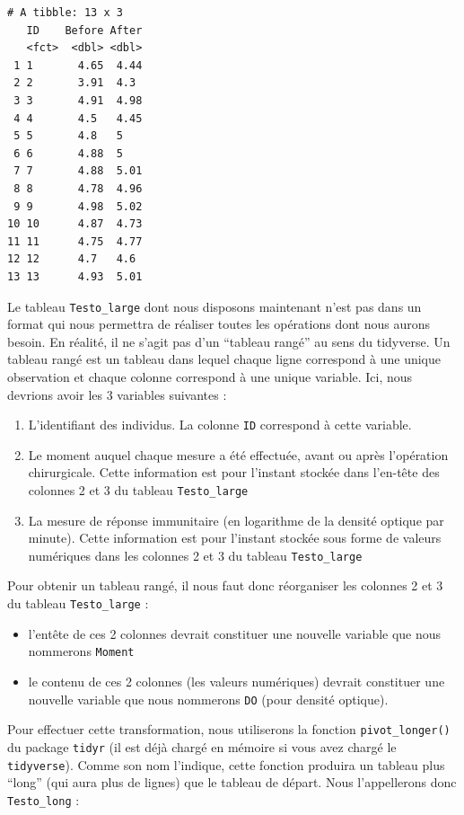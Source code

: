 \documentclass[
  a4paper,
  DIV=11,
  numbers=noendperiod,
  oneside]{scrreprt}
\providecommand{\tightlist}{%
  \setlength{\itemsep}{0pt}\setlength{\parskip}{0pt}}\usepackage{longtable,booktabs,array}
\begin{document}
\begin{verbatim}
# A tibble: 13 x 3
   ID    Before After
   <fct>  <dbl> <dbl>
 1 1       4.65  4.44
 2 2       3.91  4.3 
 3 3       4.91  4.98
 4 4       4.5   4.45
 5 5       4.8   5   
 6 6       4.88  5   
 7 7       4.88  5.01
 8 8       4.78  4.96
 9 9       4.98  5.02
10 10      4.87  4.73
11 11      4.75  4.77
12 12      4.7   4.6 
13 13      4.93  5.01
\end{verbatim}

Le tableau \texttt{Testo\_large} dont nous disposons maintenant n'est
pas dans un format qui nous permettra de réaliser toutes les opérations
dont nous aurons besoin. En réalité, il ne s'agit pas d'un ``tableau
rangé'' au sens du tidyverse. Un tableau rangé est un tableau dans
lequel chaque ligne correspond à une unique observation et chaque
colonne correspond à une unique variable. Ici, nous devrions avoir les 3
variables suivantes :

\begin{enumerate}
\def\labelenumi{\arabic{enumi}.}
\tightlist
\item
  L'identifiant des individus. La colonne \texttt{ID} correspond à cette
  variable.
\item
  Le moment auquel chaque mesure a été effectuée, avant ou après
  l'opération chirurgicale. Cette information est pour l'instant stockée
  dans l'en-tête des colonnes 2 et 3 du tableau \texttt{Testo\_large}
\item
  La mesure de réponse immunitaire (en logarithme de la densité optique
  par minute). Cette information est pour l'instant stockée sous forme
  de valeurs numériques dans les colonnes 2 et 3 du tableau
  \texttt{Testo\_large}
\end{enumerate}

Pour obtenir un tableau rangé, il nous faut donc réorganiser les
colonnes 2 et 3 du tableau \texttt{Testo\_large} :

\begin{itemize}
\tightlist
\item
  l'entête de ces 2 colonnes devrait constituer une nouvelle variable
  que nous nommerons \texttt{Moment}
\item
  le contenu de ces 2 colonnes (les valeurs numériques) devrait
  constituer une nouvelle variable que nous nommerons \texttt{DO} (pour
  densité optique).
\end{itemize}

Pour effectuer cette transformation, nous utiliserons la fonction
\texttt{pivot\_longer()} du package \texttt{tidyr} (il est déjà chargé
en mémoire si vous avez chargé le \texttt{tidyverse}). Comme son nom
l'indique, cette fonction produira un tableau plus ``long'' (qui aura
plus de lignes) que le tableau de départ. Nous l'appellerons donc
\texttt{Testo\_long} :
\end{document}

